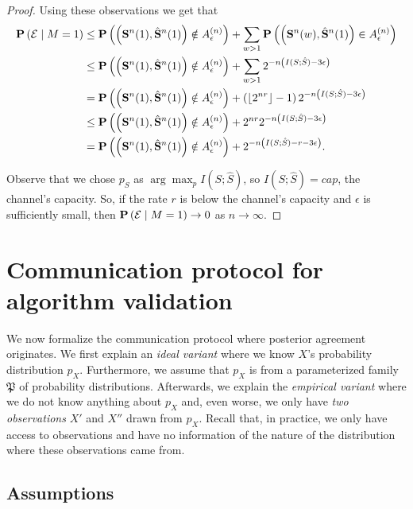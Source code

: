 \begin{proof}
Using these observations we get that
%
\begin{align*}
\mathbf{P}\left(\mathcal{E} \mid M = 1\right) &\leq \mathbf{P}\left(\left(\mathbf{S}^n(1), \hat{\mathbf{S}}^n(1)\right) \notin A^{(n)}_{\epsilon}\right) + \sum_{w > 1}\mathbf{P}\left(\left(\mathbf{S}^n(w), \hat{\mathbf{S}}^n(1)\right) \in A^{(n)}_{\epsilon}\right)\\
&\leq \mathbf{P}\left(\left(\mathbf{S}^n(1), \hat{\mathbf{S}}^n(1)\right) \notin A^{(n)}_{\epsilon}\right) + \sum_{w > 1} 2^{-n\left(I(S;\hat{S}) - 3\epsilon\right)}\\
&= \mathbf{P}\left(\left(\mathbf{S}^n(1), \hat{\mathbf{S}}^n(1)\right) \notin A^{(n)}_{\epsilon}\right) + \left(\lfloor 2^{nr}\rfloor - 1\right)2^{-n\left(I(S;\hat{S}) - 3\epsilon\right)}\\
&\leq \mathbf{P}\left(\left(\mathbf{S}^n(1), \hat{\mathbf{S}}^n(1)\right) \notin A^{(n)}_{\epsilon}\right) + 2^{nr} 2^{-n\left(I(S;\hat{S}) - 3\epsilon\right)}\\
&= \mathbf{P}\left(\left(\mathbf{S}^n(1), \hat{\mathbf{S}}^n(1)\right) \notin A^{(n)}_{\epsilon}\right) + 2^{-n\left(I(S;\hat{S}) - r - 3\epsilon\right)}.
\end{align*}
%

Observe that we chose $p_S$ as $\arg\max_p I(S;\hat{S})$, so $I(S;\hat{S}) = \mathit{cap}$, the channel's capacity. So, if the rate $r$ is below the channel's capacity and $\epsilon$ is sufficiently small, then $\mathbf{P}\left(\mathcal{E} \mid M = 1\right) \to 0$ as $n \to \infty$.
\end{proof}

\section{Communication protocol for algorithm validation}
\label{sec:comm_protocol}

We now formalize the communication protocol where posterior agreement originates. We first explain an \emph{ideal variant} where we know $X$'s probability distribution $p_X$. Furthermore, we assume that $p_X$ is from a parameterized family $\mathfrak{P}$ of probability distributions. Afterwards, we explain the \emph{empirical variant} where we do not know anything about $p_X$ and, even worse, we only have \emph{two observations} $X'$ and $X''$ drawn from $p_X$. Recall that, in practice, we only have access to observations and have no information of the nature of the distribution where these observations came from.

\subsection{Assumptions}

